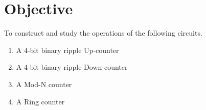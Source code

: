 \section{Objective}
To construct and study the operations of the following circuits.
\begin{enumerate}
    \item A 4-bit binary ripple Up-counter
    \item A 4-bit binary ripple Down-counter
    \item A Mod-N counter
    \item A Ring counter
\end{enumerate}